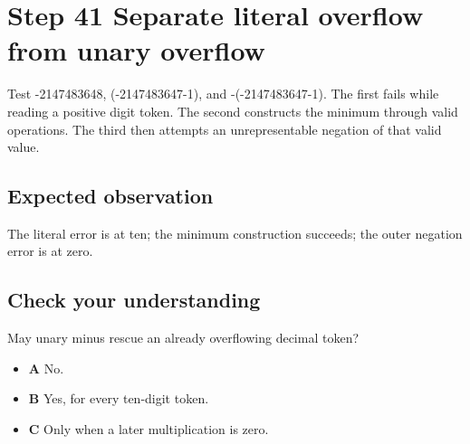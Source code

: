 \section{Step 41 Separate literal overflow from unary overflow}\label{expression-s41}

Test -2147483648, (-2147483647-1), and -(-2147483647-1). The first fails while reading a positive digit token. The second constructs the minimum through valid operations. The third then attempts an unrepresentable negation of that valid value.

\subsection{Expected observation}
The literal error is at ten; the minimum construction succeeds; the outer negation error is at zero.

\subsection{Check your understanding}
May unary minus rescue an already overflowing decimal token?

\begin{itemize}
  \item \textbf{A} No.
  \item \textbf{B} Yes, for every ten-digit token.
  \item \textbf{C} Only when a later multiplication is zero.
\end{itemize}
